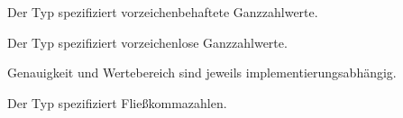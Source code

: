 Der Typ  spezifiziert vorzeichenbehaftete Ganzzahlwerte.

Der Typ  spezifiziert vorzeichenlose Ganzzahlwerte.

Genauigkeit und Wertebereich sind jeweils implementierungsabhängig.

Der Typ  spezifiziert Fließkommazahlen.







